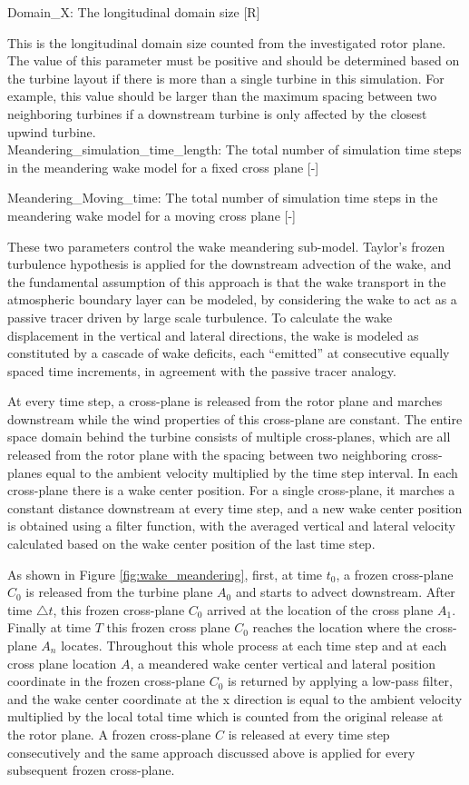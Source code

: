 \documentclass{umthesis}
\begin{document}
\noindent Domain\_X: The longitudinal domain size [R]

This is the longitudinal domain size counted from the investigated rotor plane. The value of this parameter must be positive and should be determined based on the turbine layout if there is more than a single turbine in this simulation. For example, this value should be larger than the maximum spacing between two neighboring turbines if a downstream turbine is only affected by the closest upwind turbine.\\

\noindent Meandering\_simulation\_time\_length: The total number of simulation time steps in the meandering wake model for a fixed cross plane [-]

\noindent Meandering\_Moving\_time: The total number of simulation time steps in the meandering wake model for a moving cross plane [-]

These two parameters control the wake meandering sub-model. Taylor’s frozen turbulence hypothesis is applied for the downstream advection of the wake, and the fundamental assumption of this approach is that the wake transport in the atmospheric boundary layer can be modeled, by considering the wake to act as a passive tracer driven by large scale turbulence. To calculate the wake displacement in the vertical and lateral directions, the wake is modeled as constituted by a cascade of wake deficits, each “emitted” at consecutive equally spaced time increments, in agreement with the passive tracer analogy.

At every time step, a cross-plane is released from the rotor plane and marches downstream while the wind properties of this cross-plane are constant. The entire space domain behind the turbine consists of multiple cross-planes, which are all released from the rotor plane with the spacing between two neighboring cross-planes equal to the ambient velocity multiplied by the time step interval. In each cross-plane there is a wake center position. For a single cross-plane, it marches a constant distance downstream at every time step, and a new wake center position is obtained using a filter function, with the averaged vertical and lateral velocity calculated based on the wake center position of the last time step.

As shown in Figure \ref{fig:wake_meandering}, first, at time $t_0$, a frozen cross-plane $C_0$ is released from the turbine plane $A_0$ and starts to advect downstream. After time $\triangle t$, this frozen cross-plane $C_0$ arrived at the location of the cross plane $A_1$. Finally at time $T$ this frozen cross plane $C_0$ reaches the location where the cross-plane $A_n$ locates. Throughout this whole process at each time step and at each cross plane location $A$, a meandered wake center vertical and lateral position coordinate in the frozen cross-plane $C_0$ is returned by applying a low-pass filter, and the wake center coordinate at the x direction is equal to the ambient velocity multiplied by the local total time which is counted from the original release at the rotor plane. A frozen cross-plane $C$ is released at every time step consecutively and the same approach discussed above is applied for every subsequent frozen cross-plane.
\end{document}
